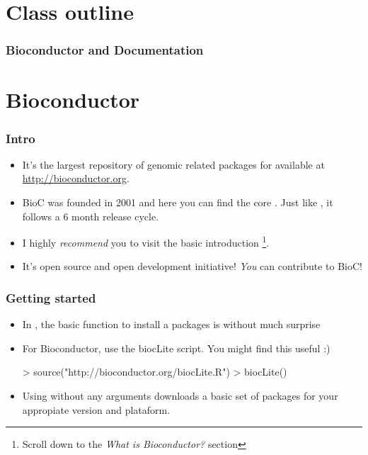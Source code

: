 




\usepackage{Sweave}


\begin{frame}[allowframebreaks]
  \titlepage
\end{frame}

\section*{Class outline}

\begin{frame}[allowframebreaks]
  \frametitle{Bioconductor and Documentation}
  \tableofcontents[hideallsubsections]
\end{frame}

\section{Bioconductor}

\begin{frame}[allowframebreaks]
  \frametitle{Intro}
  \begin{itemize}
  \item It's the largest repository of \alert{genomic} related packages for  available at \url{http://bioconductor.org}.
  \item BioC was founded in 2001 and here you can find the core . Just like , it follows a 6 month release cycle.
  \item I highly \emph{recommend} you to visit the basic introduction \footnote{Scroll down to the \emph{What is Bioconductor?} section}.
  \item It's open source and open development initiative! \emph{You} can contribute to BioC!
  \end{itemize}
\end{frame}

\begin{frame}
  \frametitle{Getting started}
  \begin{itemize}
  \item In , the basic function to install a packages is without much surprise 
  \item For Bioconductor, use the \alert{biocLite} script. You might find this  useful :)
\begin{Schunk}
\begin{Sinput}
> source("http://bioconductor.org/biocLite.R")
> biocLite()
\end{Sinput}
\end{Schunk}
  \item Using  without any arguments downloads a basic set of packages for your appropiate  version and plataform.
  \end{itemize}
\end{frame}  

